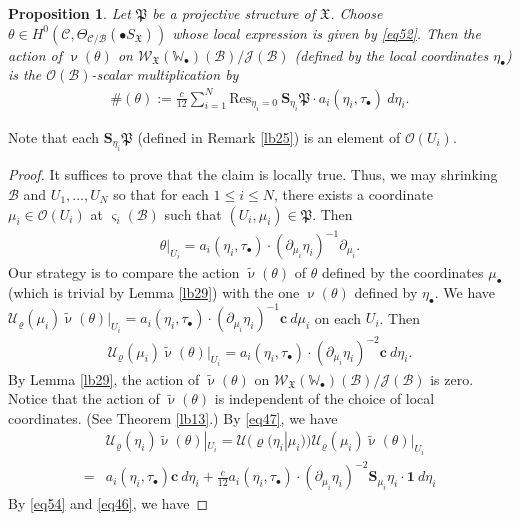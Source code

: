 \documentclass[12pt,a4paper,notitlepage]{article}
\theoremstyle{definition}
\theoremstyle{plain}
\newtheorem{pp}[df]{Proposition}
\newcommand{\fk}{\mathfrak}
\newcommand{\mc}{\mathcal}
\newcommand{\wtd}{\widetilde}
\newcommand{\id}{\mathbf{1}}
\newcommand{\Res}{\mathrm{Res}}
\newcommand{\scr}{\mathscr}
\newcommand{\sgm}{\varsigma}
\newcommand{\SX}{S_{\fk X}}
\newcommand{\blt}{\bullet}
\newcommand{\Wbb}{\mathbb W}
\newcommand{\cbf}{\mathbf c}
\newcommand{\Sbf}{\mathbf{S}}
\numberwithin{equation}{section}
\begin{document}
\begin{pp}\label{lb30}
Let $\fk P$ be a projective structure of $\fk X$. Choose $\theta\in H^0(\mc C,\Theta_{\mc C/\mc B}(\blt\SX))$ whose local expression is given by \eqref{eq52}. Then the action of $\upnu(\theta)$ on $\scr W_{\fk X}(\Wbb_\blt)(\mc B)/\scr J(\mc B)$ (defined by the local coordinates $\eta_\blt$) is the $\scr O(\mc B)$-scalar multiplication  by
	\begin{align}
	\#(\theta):=\frac{c}{12}\sum_{i=1}^N \Res_{\eta_i=0}~ \Sbf_{\eta_i}\fk P\cdot a_i(\eta_i,\tau_\blt)~d\eta_i.\label{eq56}
	\end{align}
\end{pp}
Note that each $\Sbf_{\eta_i}\fk P$ (defined in Remark \ref{lb25}) is an element of $\scr O(U_i)$.


\begin{proof}
	It suffices to prove that the claim is locally true. Thus, we may shrinking $\mc B$ and $U_1,\dots,U_N$ so  that for each $1\leq i\leq N$, there exists a coordinate  $\mu_i\in\scr O(U_i)$ at $\sgm_i(\mc B)$ such that $(U_i,\mu_i)\in\fk P$. Then
	\begin{align*}
	\theta|_{U_i}=a_i(\eta_i,\tau_\blt)\cdot(\partial_{\mu_i}\eta_i)^{-1}\partial_{\mu_i}.
	\end{align*}
	Our strategy is to compare the action $\wtd\upnu(\theta)$ of $\theta$ defined by the coordinates $\mu_\blt$ (which is trivial by Lemma \ref{lb29}) with the one $\upnu(\theta)$ defined by $\eta_\blt$. We have  $\mc U_\varrho(\mu_i)\wtd\upnu(\theta)|_{U_i}=a_i(\eta_i,\tau_\blt)\cdot(\partial_{\mu_i}\eta_i)^{-1}\cbf~d{\mu_i}$ on each $U_i$. Then
	\begin{align*}
	\mc U_\varrho(\mu_i)\wtd\upnu(\theta)|_{U_i}=a_i(\eta_i,\tau_\blt)\cdot(\partial_{\mu_i}\eta_i)^{-2}\cbf~d{\eta_i}.
	\end{align*}
	By Lemma \ref{lb29}, the action of $\wtd\upnu(\theta)$ on $\scr W_{\fk X}(\Wbb_\blt)(\mc B)/\scr J(\mc B)$ is zero. Notice that the action of $\wtd\upnu(\theta)$ is independent of the choice of local coordinates. (See Theorem \ref{lb13}.) By \eqref{eq47}, we have
	\begin{align*}
	&\mc U_\varrho(\eta_i)\wtd\upnu(\theta)|_{U_i}=\mc U(\varrho(\eta_i|\mu_i))\mc U_\varrho(\mu_i)\wtd\upnu(\theta)|_{U_i}\\
	=&a_i(\eta_i,\tau_\blt)\cbf~d{\eta_i}+\frac{c}{12} a_i(\eta_i,\tau_\blt)\cdot(\partial_{\mu_i}\eta_i)^{-2}\Sbf_{\mu_i}\eta_i\cdot \id~d{\eta_i}
	\end{align*}
	By \eqref{eq54} and \eqref{eq46}, we have

\end{proof}
\end{document}
